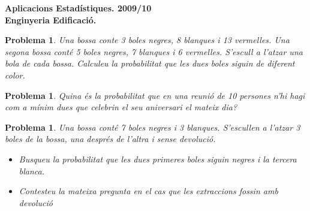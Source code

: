 \documentclass[11pt]{article}
\newcounter{prbcont}
\newtheorem{problema}[prbcont]{Problema}
\begin{document}
\begin{center}
\textbf{{\large {Aplicacions Estad\'{i}stiques. 2009/10}\\}}
\vspace{0.5cm}
\textbf{Enginyeria Edificaci\'o.}
\end{center}

\begin{problema}
Una bossa conte 3 boles negres, 8 blanques i 13 vermelles. Una segona bossa cont\'e 5 boles negres, 7 blanques i 6 vermelles. S'escull a l'atzar una bola de cada bossa. Calculeu la probabilitat que les dues boles siguin de diferent color.
\end{problema}


\begin{problema}
Quina \'es la probabilitat que en una reuni\'o de 10 persones n'hi hagi com a m\'inim dues que celebrin el seu aniversari el mateix dia?
\end{problema}

\begin{problema}
Una bossa cont\'e 7 boles negres i 3 blanques. S'escullen a l'atzar 3 boles de la bossa, una despr\'es de l'altra i sense devoluci\'o. 
\begin{itemize}
\item Busqueu la probabilitat que les dues primeres boles siguin negres i la tercera blanca.
\item Contesteu la mateixa pregunta en el cas que les extraccions fossin amb devoluci\'o
\end{itemize}
\end{problema}
\end{document}
